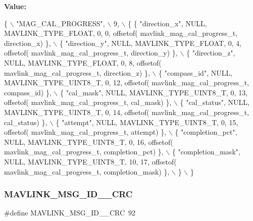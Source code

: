 {\bfseries Value\+:}
\begin{DoxyCode}
\{ \(\backslash\)
    \textcolor{stringliteral}{"MAG\_CAL\_PROGRESS"}, \(\backslash\)
    9, \(\backslash\)
    \{  \{ \textcolor{stringliteral}{"direction\_x"}, NULL, MAVLINK_TYPE_FLOAT, 0, 0, offsetof(
      mavlink_mag_cal_progress_t, direction\_x) \}, \(\backslash\)
         \{ \textcolor{stringliteral}{"direction\_y"}, NULL, MAVLINK_TYPE_FLOAT, 0, 4, offsetof(
      mavlink_mag_cal_progress_t, direction\_y) \}, \(\backslash\)
         \{ \textcolor{stringliteral}{"direction\_z"}, NULL, MAVLINK_TYPE_FLOAT, 0, 8, offsetof(
      mavlink_mag_cal_progress_t, direction\_z) \}, \(\backslash\)
         \{ \textcolor{stringliteral}{"compass\_id"}, NULL, MAVLINK_TYPE_UINT8_T, 0, 12, offsetof(
      mavlink_mag_cal_progress_t, compass\_id) \}, \(\backslash\)
         \{ \textcolor{stringliteral}{"cal\_mask"}, NULL, MAVLINK_TYPE_UINT8_T, 0, 13, offsetof(
      mavlink_mag_cal_progress_t, cal\_mask) \}, \(\backslash\)
         \{ \textcolor{stringliteral}{"cal\_status"}, NULL, MAVLINK_TYPE_UINT8_T, 0, 14, offsetof(
      mavlink_mag_cal_progress_t, cal\_status) \}, \(\backslash\)
         \{ \textcolor{stringliteral}{"attempt"}, NULL, MAVLINK_TYPE_UINT8_T, 0, 15, offsetof(
      mavlink_mag_cal_progress_t, attempt) \}, \(\backslash\)
         \{ \textcolor{stringliteral}{"completion\_pct"}, NULL, MAVLINK_TYPE_UINT8_T, 0, 16, offsetof(
      mavlink_mag_cal_progress_t, completion\_pct) \}, \(\backslash\)
         \{ \textcolor{stringliteral}{"completion\_mask"}, NULL, MAVLINK_TYPE_UINT8_T, 10, 17, offsetof(
      mavlink_mag_cal_progress_t, completion\_mask) \}, \(\backslash\)
         \} \(\backslash\)
\}
\end{DoxyCode}
\mbox{\label{mavlink__msg__mag__cal__progress_8h_acb76ff504bd05cfc435f5fdd2256ba32}} 
\subsubsection{M\+A\+V\+L\+I\+N\+K\+\_\+\+M\+S\+G\+\_\+\+I\+D\+\_\+\_\+\+C\+RC}
{\footnotesize\ttfamily \#define M\+A\+V\+L\+I\+N\+K\+\_\+\+M\+S\+G\+\_\+\+I\+D\+\_\+\_\+\+C\+RC~92}

